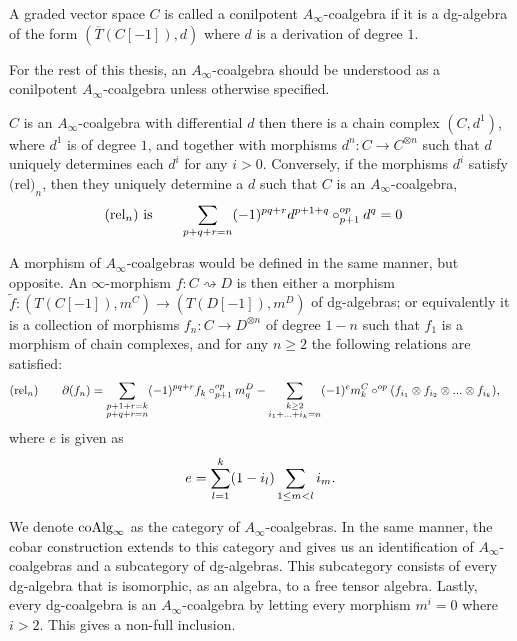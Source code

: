 \documentclass[../thesis.tex]{subfiles}
\begin{document}
        \begin{definition}
            A graded vector space $C$ is called a conilpotent $A_\infty$-coalgebra if it is a dg-algebra of the form $(\overline{T}(C[-1]), d)$ where $d$ is a derivation of degree $1$.
        \end{definition}

        \begin{remark}
            For the rest of this thesis, an $A_\infty$-coalgebra should be understood as a conilpotent $A_\infty$-coalgebra unless otherwise specified.
        \end{remark}

        \begin{corollary}
            $C$ is an $A_\infty$-coalgebra with differential $d$ then there is a chain complex $(C, d^1)$, where $d^1$ is of degree $1$, and together with morphisms $d^n : C \rightarrow C^{\otimes n}$ such that $d$ uniquely determines each $d^i$ for any $i>0$. Conversely, if the morphisms $d^i$ satisfy $\text{(rel)}_n$, then they uniquely determine a $d$ such that $C$ is an $A_\infty$-coalgebra,
            \begin{align*}
                (\text{rel}_n)\tt{ is}\qquad & \sum_{p+q+r = n}(-1)^{pq+r}d^{p+1+q}\circ^{op}_{p+1}d^q = 0
            \end{align*}
        \end{corollary}

        A morphism of $A_\infty$-coalgebras would be defined in the same manner, but opposite. An $\infty$-morphism $f: C \rightsquigarrow D$ is then either a morphism $\widetilde{f}: (T(C[-1]), m^C) \rightarrow (T(D[-1]),m^D)$ of dg-algebras; or equivalently it is a collection of morphisms $f_n : C \rightarrow D^{\otimes n}$ of degree $1-n$ such that $f_1$ is a morphism of chain complexes, and for any $n\geq 2$ the following relations are satisfied:
        \begin{align*}
            & (\text{rel}_n)\qquad \partial(f_n) = \sum_{\substack{p + 1 + r = k \\ p + q + r = n}}(-1)^{pq+r}f_k\circ^{op}_{p+1}m^D_q - \sum_{\substack{k\geq 2 \\ i_1 + ... + i_k = n}}(-1)^{e}m^C_k \circ^{op} (f_{i_1}\otimes f_{i_2}\otimes ... \otimes f_{i_k})\tt{,}
        \end{align*}
        where $e$ is given as
        \begin{align*}
            e = \sum_{l = 1}^k(1-i_l)\sum_{1\leq m < l}i_m\tt{.}
        \end{align*}

        We denote $\tt{coAlg}_\infty$ as the category of $A_\infty$-coalgebras. In the same manner, the cobar construction extends to this category and gives us an identification of $A_\infty$-coalgebras and a subcategory of dg-algebras. This subcategory consists of every dg-algebra that is isomorphic, as an algebra, to a free tensor algebra. Lastly, every dg-coalgebra is an $A_\infty$-coalgebra by letting every morphism $m^i = 0$ where $i>2$. This gives a non-full inclusion. 
\end{document}
